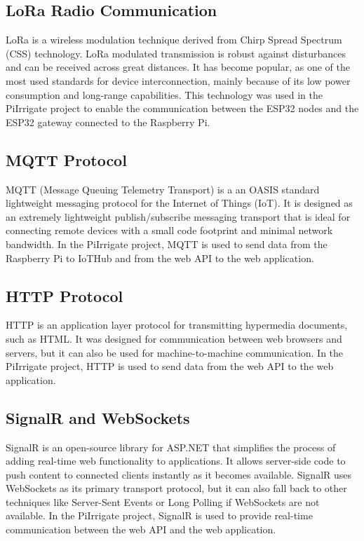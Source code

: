 \subsection{LoRa Radio Communication}
LoRa is a wireless modulation technique derived from Chirp Spread Spectrum (CSS) technology.
LoRa modulated transmission is robust against disturbances and can be received across great distances.
It has become popular, as one of the most used standards for device interconnection, mainly because of its
low power consumption and long-range capabilities\cite{lora}. This technology was used in the PiIrrigate project
to enable the communication between the ESP32 nodes and the ESP32 gateway connected to the Raspberry Pi.

\subsection{MQTT Protocol}
MQTT (Message Queuing Telemetry Transport) is a 
an OASIS standard lightweight messaging protocol for the Internet of Things (IoT).
It is designed as an extremely lightweight publish/subscribe messaging transport that is ideal for connecting 
remote devices with a small code footprint and minimal network bandwidth. 
In the PiIrrigate project, MQTT is used to send data from the Raspberry Pi to IoTHub
and from the web API to the web application.

\subsection{HTTP Protocol}
HTTP is an application layer protocol for transmitting hypermedia documents, such as HTML.
It was designed for communication between web browsers and servers, 
but it can also be used for machine-to-machine communication.
In the PiIrrigate project, HTTP is used to send data from the web API to the web application\cite{http}.

\subsection{SignalR and WebSockets}
SignalR is an open-source library for ASP.NET that simplifies 
the process of adding real-time web functionality to applications.
It allows server-side code to push content to connected clients instantly as it becomes available.
SignalR uses WebSockets as its primary transport protocol, but it can also fall back to other techniques like
Server-Sent Events or Long Polling if WebSockets are not available.
In the PiIrrigate project, SignalR is used to provide real-time communication 
between the web API and the web application.


